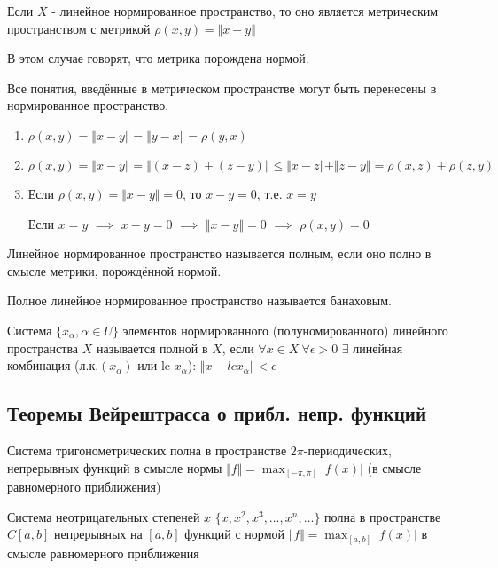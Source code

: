 \documentclass{article}
\begin{document}
\begin{lemma}
  Если $X$ - линейное нормированное пространство, то оно является
  метрическим пространством с метрикой $\rho(x,y)=\Vert x-y \Vert$
\end{lemma}
\begin{remark}
  В этом случае говорят, что метрика порождена нормой.
\end{remark}
\begin{remark}
  Все понятия, введённые в метрическом пространстве могут быть перенесены в нормированное пространство.
\end{remark}
\begin{definition}
  \phantom{.}

  \begin{enumerate}
    \item $\rho(x,y)=\Vert x-y \Vert=\Vert y-x \Vert=\rho(y,x)$
    \item $\rho(x,y)=\Vert x-y \Vert=\Vert (x-z)+(z-y) \Vert\le \Vert x-z \Vert + \Vert z-y \Vert=\rho(x,z)+\rho(z,y)$
    \item Если $\rho(x,y)=\Vert x-y \Vert=0$, то $x-y=0$, т.е. $x=y$

      Если $x=y$ $\implies$ $x-y=0$ $\implies$ $\Vert x-y \Vert=0$ $\implies $ $\rho(x,y)=0$
  \end{enumerate}
\end{definition}
\begin{definition}
  Линейное нормированное пространство называется полным, если оно полно в смысле
  метрики, порождённой нормой.
\end{definition}
\begin{definition}
  Полное линейное нормированное пространство называется банаховым. 
\end{definition}
\begin{definition}
  Система $\{x_{\alpha}, \alpha \in U\}$ элементов нормированного (полуномированного)
  линейного пространства $X$ называется полной в $X$, если $\forall x \in X\ \forall \epsilon>0$
  $\exists $ линейная комбинация (л.к.$(x_\alpha)$ или lc $x_\alpha$): $\Vert x- lc x_{\alpha}\Vert<\epsilon$
\end{definition}
\subsection{Теоремы Вейрештрасса о прибл. непр. функций}
\begin{theorem}[Т1 с волной]
  Система тригонометрических полна в пространстве $2\pi$-периодических,
  непрерывных функций в смысле нормы $\Vert f \Vert=\max_{[-\pi,\pi]}|f(x)|$
  (в смысле равномерного приближения)
\end{theorem}
\begin{theorem}[Т2 с волной]
  Система неотрицательных степеней $x$ $\{x,x^{2},x^{3},\dots ,x^{n},\dots \}$
  полна в пространстве $C[a,b]$ непрерывных на $[a,b]$ функций с нормой $\Vert f \Vert=\max_{[a,b]}|f(x)|$
  в смысле равномерного приближения
\end{theorem}
\end{document}
